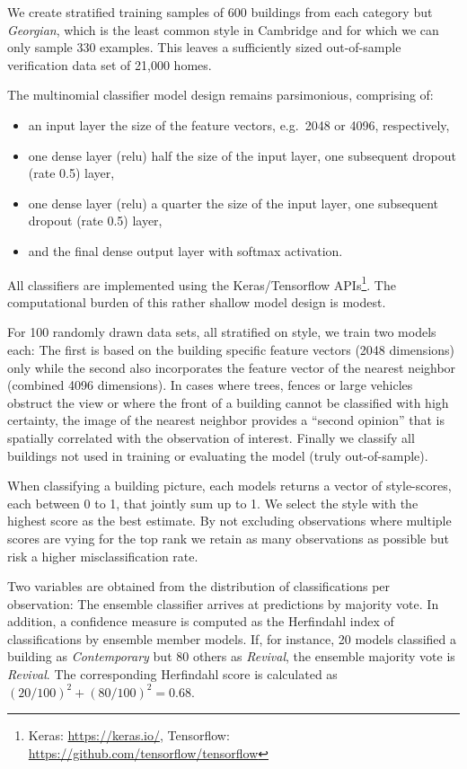 \documentclass[]{article}
\begin{document}
We create stratified training samples of 600 buildings from each
category but \emph{Georgian}, which is the least common style in
Cambridge and for which we can only sample 330 examples. This leaves a
sufficiently sized out-of-sample verification data set of 21,000 homes.

The multinomial classifier model design remains parsimonious, comprising
of:

\begin{itemize}
\item
  an input layer the size of the feature vectors, e.g.~2048 or 4096,
  respectively,
\item
  one dense layer (relu) half the size of the input layer, one
  subsequent dropout (rate 0.5) layer,
\item
  one dense layer (relu) a quarter the size of the input layer, one
  subsequent dropout (rate 0.5) layer,
\item
  and the final dense output layer with softmax activation.
\end{itemize}

All classifiers are implemented using the Keras/Tensorflow
APIs\footnote{Keras: \href{https://keras.io/}{https://keras.io/}, Tensorflow: \href{https://github.com/tensorflow/tensorflow}{https://github.com/tensorflow/tensorflow}}.
The computational burden of this rather shallow model design is modest.

For 100 randomly drawn data sets, all stratified on style, we train two
models each: The first is based on the building specific feature vectors
(2048 dimensions) only while the second also incorporates the feature
vector of the nearest neighbor (combined 4096 dimensions). In cases
where trees, fences or large vehicles obstruct the view or where the
front of a building cannot be classified with high certainty, the image
of the nearest neighbor provides a ``second opinion'' that is spatially
correlated with the observation of interest. Finally we classify all
buildings not used in training or evaluating the model (truly
out-of-sample).

When classifying a building picture, each models returns a vector of
style-scores, each between 0 to 1, that jointly sum up to 1. We select
the style with the highest score as the best estimate. By not excluding
observations where multiple scores are vying for the top rank we retain
as many observations as possible but risk a higher misclassification
rate.

Two variables are obtained from the distribution of classifications per
observation: The ensemble classifier arrives at predictions by majority
vote. In addition, a confidence measure is computed as the Herfindahl
index of classifications by ensemble member models. If, for instance, 20
models classified a building as \emph{Contemporary} but 80 others as
\emph{Revival}, the ensemble majority vote is \emph{Revival}. The
corresponding Herfindahl score is calculated as
\((20/100)^2 + (80/100)^2 = 0.68\).
\end{document}

